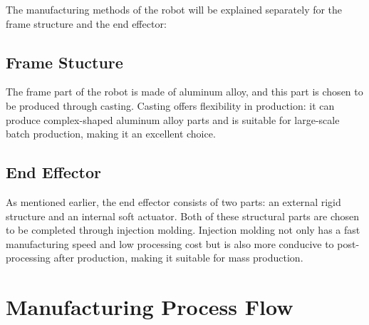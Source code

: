 \documentclass[10pt, a4paper, twocolumn]{article}
\begin{document}
The manufacturing methods of the robot will be explained separately for the frame structure and the end effector:

\subsection{Frame Stucture}
The frame part of the robot is made of aluminum alloy, and this part is chosen to be produced through casting. Casting offers flexibility in production: it can produce complex-shaped aluminum alloy parts and is suitable for large-scale batch production, making it an excellent choice.

\subsection{End Effector}
As mentioned earlier, the end effector consists of two parts: an external rigid structure and an internal soft actuator. Both of these structural parts are chosen to be completed through injection molding. Injection molding not only has a fast manufacturing speed and low processing cost but is also more conducive to post-processing after production, making it suitable for mass production.

\section{Manufacturing Process Flow}
\end{document}
